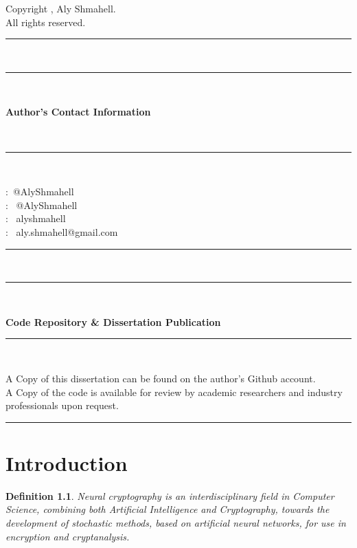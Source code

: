 \documentclass[a4paper, 12pt]{report}
\newtheorem{definition}{Definition}
\begin{document}
\begin{titlepage}
\begin{tcbraster}[raster columns=2,raster rows=1,
		enhanced,size=small,fit algorithm=hybrid* ]
		\begin{center}
			\begin{tcolorbox}[colback=white]
				\begin{center}
					Copyright \textcopyright {}, Aly Shmahell.\\
					All rights reserved.
				\end{center}
		\end{tcolorbox}
		\end{center}
	\end{tcbraster}
	\rule{\linewidth}{0.5mm} \\[1.5cm]
	\noindent
	\rule{\linewidth}{0.5mm} \\[0.4cm]
	\begin{minipage}{0.5\textwidth}
		\Large{\textbf{Author's Contact Information}}
	\end{minipage}
	\\[0.1cm]
	\rule{\linewidth}{0.5mm} \\[0.1cm]
	\noindent
	\begin{center}
		\begin{minipage}{0.5\textwidth}
			\faGithub \space:~@AlyShmahell \\
			\faTwitter \space:~ @AlyShmahell \\
			\faLinkedinSquare \space:~ alyshmahell \\
			\faEnvelope \space:~ aly.shmahell@gmail.com
		\end{minipage}
	\end{center}
	\rule{\linewidth}{0.5mm} \\[1.5cm]
	\noindent
	\rule{\linewidth}{0.5mm} \\[0.2cm]
	\begin{minipage}{\textwidth}
		\Large{\textbf{Code Repository \& Dissertation Publication}}
	\end{minipage}
	\rule{\linewidth}{0.5mm} \\[0.1cm]
	\noindent
		\begin{flushleft}
		A Copy of this dissertation can be found on the author's Github account.\\
		A Copy of the code is available for review by academic researchers and industry professionals upon request.
		\end{flushleft}	
	\rule{\linewidth}{0.5mm}
	\noindent
\end{titlepage}
\newpage
\begin{abstract}
\end{abstract}
\newpage
\chapter{Introduction}\label{sec:introduction}
\begin{definition}
	Neural cryptography is an interdisciplinary field in Computer Science, combining both Artificial Intelligence and Cryptography, towards the development of stochastic methods, based on artificial neural networks, for use in encryption and cryptanalysis.
\end{definition}
\end{document}
